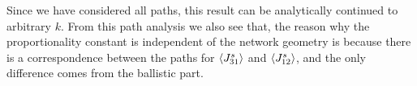 \documentclass[
 amsmath,amssymb,
 aps,
 pre,
 longbibliography,
 10pt, onecolumn,
 notitlepage
]{revtex4-1}
\begin{document}
Since we have considered all paths, this result can be analytically continued to arbitrary $k$.
From this path analysis we also see that, the reason why the proportionality constant is independent of the network geometry is because there is a correspondence between the paths for $\expval{J_{31}^s}$ and $\expval{J_{12}^s}$, and the only difference comes from the ballistic part.



\end{document}
